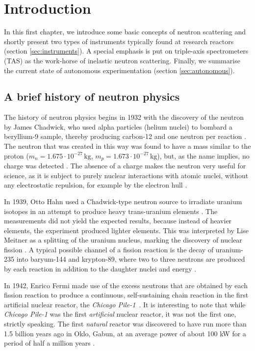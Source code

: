 %
%

\chapter{Introduction}
\label{ch:intro}
In this first chapter, we introduce some basic concepts of neutron scattering and shortly present two types of
instruments typically found at research reactors (section \ref{sec:instruments}). A special emphasis is put
on triple-axis spectrometers (TAS) as the work-horse of inelastic neutron scattering. Finally, we summarise
the current state of autonomous experimentation (section \ref{sec:autonomous}).


\section{A brief history of neutron physics \label{sec:neutrons}}

The history of neutron physics begins in 1932 with the discovery of the neutron by James Chadwick, who used
alpha particles (helium nuclei) to bombard a beryllium-9 sample, thereby producing carbon-12 and one neutron
per reaction \cite[p. 1]{Jacrot2021}. The neutron that was created in this way was found to have a mass similar
to the proton ($m_n = 1.675\cdot10^{-27}\,\mathrm{kg}$, $m_p = 1.673\cdot10^{-27}\,\mathrm{kg}$), but, as the
name implies, no charge was detected \cite[p. 2]{Squires2012}. The absence of a charge makes the neutron very
useful for science, as it is subject to purely nuclear interactions with atomic nuclei, without any electrostatic
repulsion, for example by the electron hull \cite[p. 1]{Squires2012}.

In 1939, Otto Hahn used a Chadwick-type neutron source to irradiate uranium isotopes in an attempt to produce
heavy trans-uranium elements \cite{wiki_fission}. The measurements did not yield the expected results, because
instead of heavier elements, the experiment produced lighter elements. This was interpreted by Lise Meitner as
a splitting of the uranium nucleus, marking the discovery of nuclear fission \cite{wiki_fission}. A typical possible
channel of a fission reaction is the decay of uranium-235 into baryum-144 and krypton-89, where two to three
neutrons are produced by each reaction in addition to the daughter nuclei and energy \cite{wiki_fission}.

In 1942, Enrico Fermi made use of the excess neutrons that are obtained by each fission reaction to produce a
continuous, self-sustaining chain reaction in the first artificial nuclear reactor, the
\textit{Chicago Pile-1}~\cite[p.1]{Jacrot2021}.
It is interesting to note that while \textit{Chicago Pile-1} was the first \textit{artificial} nuclear reactor,
it was not the first one, strictly speaking. The first \textit{natural} reactor was discovered to have run more
than 1.5 billion years ago in Oklo, Gabun, at an average power of about 100 kW for a period of half a million
years \cite{wiki_oklo}.

